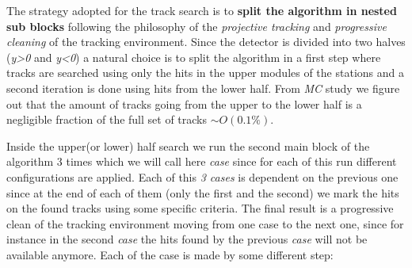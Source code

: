 \documentclass[paper=a4, fontsize=10pt]{scrartcl}
\numberwithin{equation}{section}		%
\numberwithin{figure}{section}			%
\numberwithin{table}{section}				%
\begin{document}
The strategy adopted for the track search is to \textbf{split the algorithm in nested sub blocks} following the philosophy of the \textit{projective tracking} and \textit{progressive cleaning} of the tracking environment. Since the detector is divided into two halves (\textit{y>0} and \textit{y<0}) a natural choice is to split the algorithm in a first step where tracks are searched using only the hits in the upper modules of the stations and a second iteration is done using hits from the lower half. 
From \textit{MC} study we figure out that the amount of tracks going from the upper to the lower half is a negligible fraction of the full set of tracks \textit{$\sim O(0.1 \%)$}. 

Inside the upper(or lower) half search we run the second main block of the algorithm 3 times which we will call here \textit{case} since for each of this run different configurations are applied. Each of this \textit{3 cases} is dependent on the previous one since at the end of each of them (only the first and the second) we mark the hits on the found tracks using some specific criteria. The final result is a progressive clean of the tracking environment moving from one case to the next one, since for instance in the second \textit{case} the hits found by the previous \textit{case} will not be available anymore.
Each of the case is made by some different step:
\end{document}
